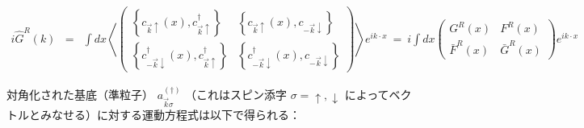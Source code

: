 \documentclass[uplatex,a4j,12pt,dvipdfmx]{jsarticle}
\begin{document}
\begin{eqnarray}
	i
	\hat{G}^{R}(k)
	&=&
	\int \! dx
	\left\langle
	\left(
	\begin{array}{cc}
			\left\{ c_{\vec{k}\uparrow}(x), c_{\vec{k}\uparrow}^{\dagger} \right\}              & \left\{ c_{\vec{k}\uparrow}(x), c_{-\vec{k}\downarrow} \right\}
			\\[3mm]
			\left\{ c_{-\vec{k}\downarrow}^{\dagger}(x), c_{\vec{k}\uparrow}^{\dagger} \right\} & \left\{ c_{-\vec{k}\downarrow}^{\dagger}(x), c_{-\vec{k}\downarrow} \right\}
		\end{array}
	\right)
	\right\rangle
	e^{ i k \cdot x }
	\ = \
	i
	\int \! dx
	\left(
	\begin{array}{cc}
			G^{R}(x)       & F^{R}(x)
			\\[3mm]
			\bar{F}^{R}(x) & \bar{G}^{R}(x)
		\end{array}
	\right)
	e^{ i k \cdot x }
\end{eqnarray}
%

対角化された基底（準粒子） $a_{\vec{k} \sigma}^{(\dagger)}$
（これはスピン添字 $\sigma=\uparrow,\downarrow$ によってベクトルとみなせる）に対する運動方程式は以下で得られる：
\end{document}
